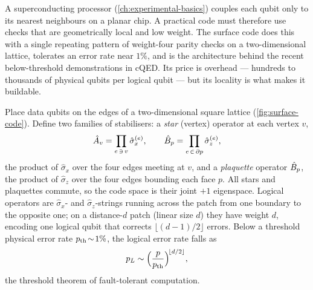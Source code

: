 \begin{phenomenon}
A superconducting processor (\cref{ch:experimental-basics}) couples each
qubit only to its nearest neighbours on a planar chip. A practical code
must therefore use checks that are geometrically local and low weight.
The surface code does this with a single repeating pattern of weight-four
parity checks on a two-dimensional lattice, tolerates an error rate near
$1\%$, and is the architecture behind the recent below-threshold
demonstrations in cQED. Its price is overhead --- hundreds to thousands
of physical qubits per logical qubit --- but its locality is what makes
it buildable.
\end{phenomenon}

\begin{statement}
\label{stmt:surface-code}
Place data qubits on the edges of a two-dimensional square lattice
(\cref{fig:surface-code}). Define two families of stabilisers: a
\emph{star} (vertex) operator at each vertex $v$,
\begin{equation}
\hat{A}_v=\prod_{e\,\ni\,v}\hat\sigma_x^{(e)},
\qquad
\hat{B}_p=\prod_{e\,\in\,\partial p}\hat\sigma_z^{(e)},
\end{equation}
the product of $\hat\sigma_x$ over the four edges meeting at $v$, and a
\emph{plaquette} operator $\hat{B}_p$, the product of $\hat\sigma_z$ over
the four edges bounding each face $p$. All stars and plaquettes commute,
so the code space is their joint $+1$ eigenspace. Logical operators are
$\hat\sigma_x$- and $\hat\sigma_z$-strings running across the patch from
one boundary to the opposite one; on a distance-$d$ patch (linear size
$d$) they have weight $d$, encoding one logical qubit that corrects
$\lfloor(d-1)/2\rfloor$ errors. Below a threshold physical error rate
$p_{\rm th}\!\sim\!1\%$, the logical error rate falls as
\begin{equation}
\label{eq:threshold}
p_L\sim\Bigl(\frac{p}{p_{\rm th}}\Bigr)^{\!\lfloor d/2\rfloor},
\end{equation}
the threshold theorem of fault-tolerant computation.
\end{statement}

